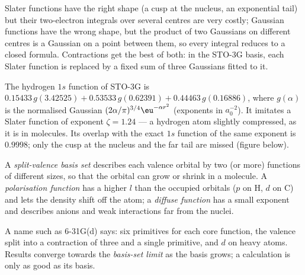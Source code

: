 Slater functions have the right shape (a cusp at the nucleus, an
exponential tail) but their two-electron integrals over several centres are
very costly; Gaussian functions have the wrong shape, but the product of two
Gaussians on different centres is a Gaussian on a point between them, so
every integral reduces to a closed formula. Contractions get the best of
both: in the STO-3G basis, each Slater function is replaced by a fixed sum of
three Gaussians fitted to it.

\begin{example}\label{ex:b3:computational-chemistry:sto3g}
The hydrogen $1s$ function of STO-3G is $0.15433\,g(3.42525) + 0.53533\,
g(0.62391) + 0.44463\,g(0.16886)$, where $g(\alpha)$ is the normalised Gaussian
$(2\alpha/\pi)^{3/4}\eu^{-\alpha r^2}$ (exponents in $a_0^{-2}$). It imitates a
Slater function of exponent $\zeta = 1.24$ --- a hydrogen atom slightly
compressed, as it is in molecules. Its overlap with the exact $1s$ function
of the same exponent is $0.9998$; only the cusp at the nucleus and the far
tail are missed (figure below).
\end{example}

\begin{definition}\label{def:b3:computational-chemistry:split-valence}
A \emph{split-valence basis set} describes each
valence orbital by two (or more) functions of different sizes, so that the
orbital can grow or shrink in a molecule. A \emph{polarisation
function} has a higher $l$ than the occupied
orbitals ($p$ on H, $d$ on C) and lets the density shift off the atom; a
\emph{diffuse function} has a small exponent and
describes anions and weak interactions far from the nuclei.
\end{definition}

A name such as 6-31G(d) says: six primitives for each core function, the
valence split into a contraction of three and a single primitive, and $d$
 on heavy atoms. Results converge towards the
\emph{basis-set limit} as the basis grows; a calculation is only as good as
its basis.

